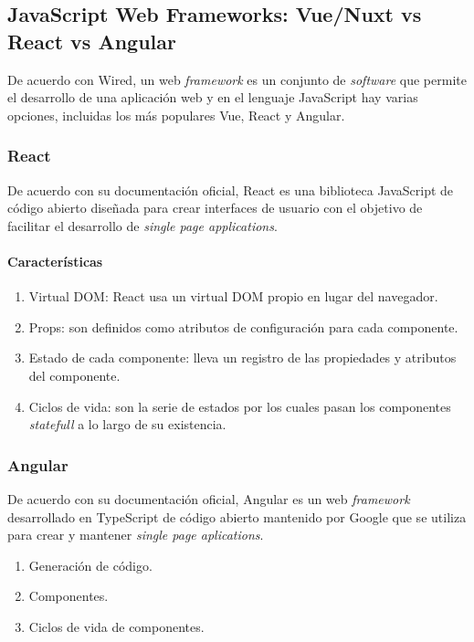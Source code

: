 \subsection{JavaScript Web Frameworks: Vue/Nuxt vs React vs Angular}\label{ref:sec-nuxt-framework}


De acuerdo con Wired\cite{wired_wired_2020}, un web \textit{framework} es un conjunto de \textit{software} que permite el desarrollo de una aplicación web y en el lenguaje JavaScript hay varias opciones, incluidas los más populares Vue, React y Angular.

\subsubsection*{React}
De acuerdo con su documentación oficial\cite{react_react_2020}, React es una biblioteca JavaScript de código abierto diseñada para crear interfaces de usuario con el objetivo de facilitar el desarrollo de \textit{single page applications}.

\paragraph*{Características}
\begin{enumerate}
    \item Virtual DOM: React usa un virtual DOM propio en lugar del navegador.
    \item Props: son definidos como atributos de configuración para cada componente.
    \item Estado de cada componente: lleva un registro de las propiedades y atributos del componente.
    \item Ciclos de vida: son la serie de estados por los cuales pasan los componentes \textit{statefull} a lo largo de su existencia. 
\end{enumerate}

\subsubsection*{Angular}
De acuerdo con su documentación oficial\cite{angular_angular_2020}, Angular es un web \textit{framework} desarrollado en TypeScript de código abierto mantenido por Google que se utiliza para crear y mantener \textit{single page aplications}. 

\begin{enumerate}
    \item Generación de código.
    \item Componentes.
    \item Ciclos de vida de componentes.
    
\end{enumerate}

